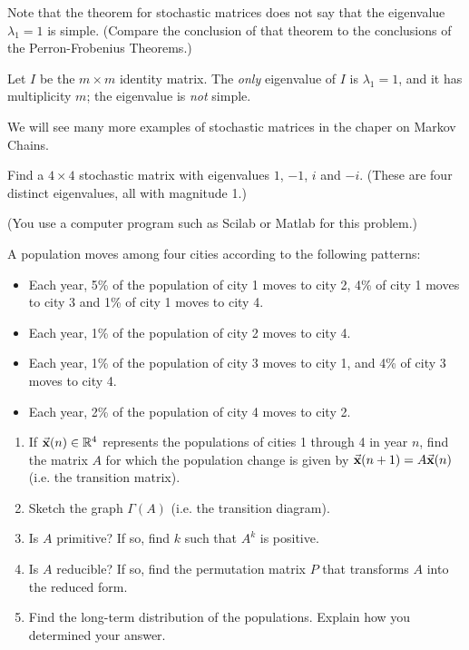 Note that the theorem for stochastic matrices
does not say that the eigenvalue
$\lambda_1 = 1$ is simple.
(Compare the conclusion of that theorem to the
conclusions of the Perron-Frobenius Theorems.)
\begin{xexample}
Let $I$ be the $m\times m$ identity matrix.
The \emph{only} eigenvalue of $I$ is $\lambda_1 = 1$, and it
has multiplicity $m$; the eigenvalue is \emph{not} simple.
\end{xexample}
We will see many more examples of stochastic matrices
in the chaper on Markov Chains.
%

\newpage
\begin{exercises}
\begin{exercise}
Find a $4\times 4$ stochastic matrix with eigenvalues
$1$, $-1$, $i$ and $-i$.
(These are four distinct eigenvalues, all with magnitude 1.)
\end{exercise}
\begin{exercise}
\label{ex:stoch4cities}
(You use a computer program such as Scilab or Matlab for this problem.)

A population moves among four cities according to the following patterns:
\begin{itemize}
\item Each year, 5\% of the population of city 1 moves to city 2,
4\% of city 1 moves to city 3 and 1\% of city 1 moves to city 4.
\item Each year, 1\% of the population of city 2 moves to city 4.
\item Each year, 1\% of the population of city 3 moves to city 1,
and 4\% of city 3 moves to city 4.
\item Each year, 2\% of the population of city 4 moves to city 2.
\end{itemize}
\begin{enumerate}
\item If $\vec{\textbf{x}}(n)\in\mathbb{R}^4$ represents the populations of cities 1 through 4
in year $n$, find the matrix $A$ for which the population change is given
by $\vec{\textbf{x}}(n+1) = A\vec{\textbf{x}}(n)$ (i.e. the transition matrix).
\item Sketch the graph $\Gamma(A)$ (i.e. the transition diagram).
\item Is $A$ primitive?  If so, find $k$ such that $A^k$ is positive.
\item Is $A$ reducible? If so, find the permutation matrix $P$ that
transforms $A$ into the reduced form.
\item Find the long-term distribution of the populations.
Explain how you determined your answer.
\end{enumerate}

\end{exercise}
\end{exercises}
%
\newpage
%
